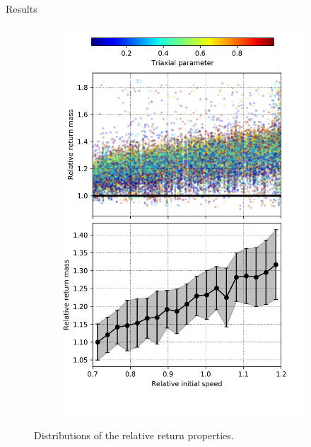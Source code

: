 \documentclass{beamer}
\begin{document}
\begin{frame}{Results}
\begin{figure}[h]
\begin{subfigure}[b]{0.35\linewidth}
			\includegraphics[width = \linewidth]{"../Files/Week 14/relative_mass"}
		\end{subfigure}
		\caption{Distributions of the relative return properties.}
		\label{fig: relatives}
	\end{figure}
\end{frame}
\end{document}
